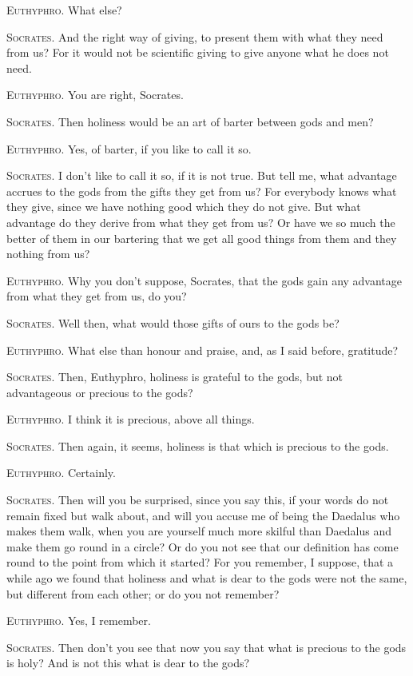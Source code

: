 \textsc{Euthyphro}. What else?

\textsc{Socrates}. And the right way of giving, to present them with
what they need from us? For it would not be scientific giving to give
anyone what he does not need.

\textsc{Euthyphro}. You are right, Socrates.

\textsc{Socrates}. Then holiness would be an art of barter between
gods and men?

\textsc{Euthyphro}. Yes, of barter, if you like to call it so.

\textsc{Socrates}. I don't like to call it so, if it is not true. But
tell me, what advantage accrues to the gods from  the gifts
they get from us? For everybody knows what they give, since we have
nothing good which they do not give. But what advantage do they derive
from what they get from us? Or have we so much the better of them in
our bartering that we get all good things from them and they nothing
from us?

\textsc{Euthyphro}. Why you don't suppose, Socrates, that the gods
gain any advantage from what they get from us, do you?

\textsc{Socrates}. Well then, what would those gifts of ours to the
gods be?

\textsc{Euthyphro}. What else than honour and praise, and, as I said
before, gratitude?

\textsc{Socrates}. Then, Euthyphro, holiness is grateful to the gods,
but not advantageous or precious to the gods?

\textsc{Euthyphro}. I think it is precious, above all things.

\textsc{Socrates}. Then again, it seems, holiness is that which is
precious to the gods.

\textsc{Euthyphro}. Certainly.

\textsc{Socrates}. Then will you be surprised, since you say this, if
your words do not remain fixed but walk about, and will you accuse me
of being the Daedalus who makes them walk, when you are yourself much
more skilful than Daedalus and make them go round in a circle? Or do
you not see that our definition has come round to the point from which
it started? For you remember, I suppose, that a while ago we found
that holiness and what is dear to the gods were not the same, but
different from each other; or do you not remember?

\textsc{Euthyphro}. Yes, I remember.

\textsc{Socrates}. Then don't you see that now you say  that
what is precious to the gods is holy? And is not this what is dear to
the gods?

